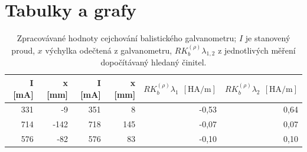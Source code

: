 \documentclass[english]{article}
\newcommand{\unit}[1]{\ \mathrm{#1}}
\begin{document}
\section{Tabulky a grafy}

\begin{table}[htbp]
  \centering
    \begin{tabular}{|r|r|r|r|r|r|}
    \hline
    \textbf{I [mA]} & \textbf{x [mm]} & \textbf{I [mA]} & \textbf{x [mm]} & \boldmath{}\textbf{$RK_b^{(\rho)}\lambda_1~\unit{[HA/m]}$}\unboldmath{} & \boldmath{}\textbf{$RK_b^{(\rho)}\lambda_2~\unit{[HA/m]}$}\unboldmath{} \bigstrut\\
    \hline
    331   & -9    & 351   & 8     & -0,53 & 0,64 \bigstrut\\
    \hline
    714   & -142  & 718   & 145   & -0,07 & 0,07 \bigstrut\\
    \hline
    576   & -82   & 576   & 83    & -0,10 & 0,10 \bigstrut\\
    \hline
    \end{tabular}%
  \caption{ Zpracovávané hodnoty cejchování balistického galvanometru; $I$ je stanovený proud, $x$ výchylka odečtená z galvanometru, $RK_b^{(\rho)}\lambda_{1,2}$ z jednotlivých měření dopočítávaný hledaný činitel.  }
  \label{tab:cejch}%
\end{table}%
 
\end{document}
